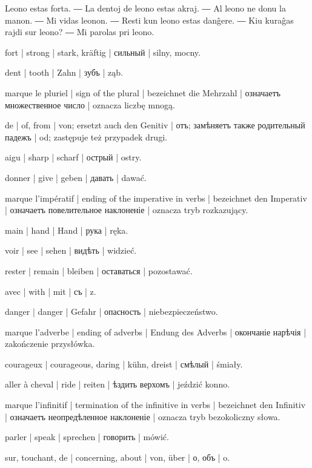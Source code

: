 
Leono estas forta. ― La dentoj de leono estas akraj. ― Al leono ne donu la manon. ― Mi vidas leonon. ― Resti kun leono estas danĝere. ― Kiu kuraĝas rajdi sur leono? ― Mi parolas pri leono.

\begin{ekzvocab}{1em}
 fort | strong | stark, kräftig | сильный | silny, mocny.

 dent | tooth | Zahn | зубъ | ząb.

 marque le pluriel | sign of the plural | bezeichnet die Mehrzahl | означаетъ множественное число | oznacza liczbę mnogą.

 de | of, from | von; ersetzt auch den Genitiv | отъ; замѣняетъ также родительный падежъ | od; zastępuje też przypadek drugi.

 aigu | sharp | scharf | острый | ostry.

 donner | give | geben | давать | dawać.

 marque l’impératif | ending of the imperative in verbs | bezeichnet den Imperativ | означаетъ повелительное наклоненіе | oznacza tryb rozkazujący.

 main | hand | Hand | рука | ręka.

 voir | see | sehen | видѣть | widzieć.

 rester | remain | bleiben | оставаться | pozostawać.

 avec | with | mit | съ | z.

 danger | danger | Gefahr | опасность | niebezpieczeństwo.

 marque l’adverbe | ending of adverbs | Endung des Adverbs | окончаніе нарѣчія | zakończenie przysłówka.

 courageux | courageous, daring | kühn, dreist | смѣлый | śmiały.

 aller à cheval | ride | reiten | ѣздить верхомъ | jeździć konno.

 marque l’infinitif | termination of the infinitive in verbs | bezeichnet den Infinitiv | означаетъ неопредѣленное наклоненіе | oznacza tryb bezokoliczny słowa.

 parler | speak | sprechen | говорить | mówić.

 sur, touchant, de | concerning, about | von, über | о, объ | o.

\end{ekzvocab}

